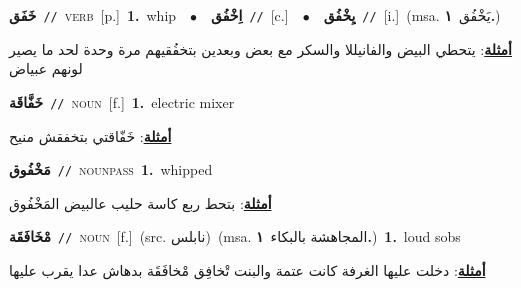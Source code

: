 \documentclass[10pt,a4paper,twoside]{article} %
\begin{document}
\begin{multicols}{2}
{\setlength\topsep{0pt}\textbf{\foreignlanguage{arabic}{خَفَق}}\ {\color{gray}\texttt{//}\color{black}}\ \textsc{verb}\ [p.]\ \textbf{1.}~whip\ \ $\bullet$\ \ \setlength\topsep{0pt}\textbf{\foreignlanguage{arabic}{اِخْفُق}}\ {\color{gray}\texttt{//}\color{black}}\ [c.]\ \ $\bullet$\ \ \setlength\topsep{0pt}\textbf{\foreignlanguage{arabic}{يِخْفُق}}\ {\color{gray}\texttt{//}\color{black}}\ [i.]\ \color{gray}(msa. \foreignlanguage{arabic}{يَخْفُق}~\foreignlanguage{arabic}{\textbf{١.}})\color{black}\  \begin{flushright}\color{gray}\foreignlanguage{arabic}{\textbf{\underline{\foreignlanguage{arabic}{أمثلة}}}: يتحطي البيض والفانيللا والسكر مع بعض وبعدين بتخفُقيهم مرة وحدة لحد ما يصير لونهم عبياض}\end{flushright}\color{black}} \vspace{2mm}

{\setlength\topsep{0pt}\textbf{\foreignlanguage{arabic}{خَفَّاقَة}}\ {\color{gray}\texttt{//}\color{black}}\ \textsc{noun}\ [f.]\ \textbf{1.}~electric mixer\  \begin{flushright}\color{gray}\foreignlanguage{arabic}{\textbf{\underline{\foreignlanguage{arabic}{أمثلة}}}: خَفّاقتي بتخفقش منيح}\end{flushright}\color{black}} \vspace{2mm}

{\setlength\topsep{0pt}\textbf{\foreignlanguage{arabic}{مَخْفُوق}}\ {\color{gray}\texttt{//}\color{black}}\ \textsc{noun\textunderscore pass}\ \textbf{1.}~whipped\  \begin{flushright}\color{gray}\foreignlanguage{arabic}{\textbf{\underline{\foreignlanguage{arabic}{أمثلة}}}: بتحط ربع كاسة حليب عالبيض المَخْفُوق}\end{flushright}\color{black}} \vspace{2mm}

{\setlength\topsep{0pt}\textbf{\foreignlanguage{arabic}{مْخَافَقَة}}\ {\color{gray}\texttt{//}\color{black}}\ \textsc{noun}\ [f.]\ (src. \color{gray}\foreignlanguage{arabic}{نابلس}\color{black})\ \color{gray}(msa. \foreignlanguage{arabic}{المجاهشة بالبكاء}~\foreignlanguage{arabic}{\textbf{١.}})\color{black}\ \textbf{1.}~loud sobs\  \begin{flushright}\color{gray}\foreignlanguage{arabic}{\textbf{\underline{\foreignlanguage{arabic}{أمثلة}}}: دخلت عليها الغرفة كانت عتمة والبنت تْخافِق مْخافَقَة بدهاش عدا يقرب عليها}\end{flushright}\color{black}} \vspace{2mm}


\end{multicols}
\end{document}
